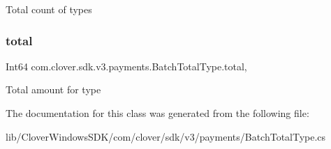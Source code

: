 Total count of types 

\mbox{\label{classcom_1_1clover_1_1sdk_1_1v3_1_1payments_1_1_batch_total_type_aa1fbbae3f87aa1c20b15cab3e1e03dd7}} 
\subsubsection{\texorpdfstring{total}{total}}
{\footnotesize\ttfamily Int64 com.\+clover.\+sdk.\+v3.\+payments.\+Batch\+Total\+Type.\+total\hspace{0.3cm}{\ttfamily [get]}, {\ttfamily [set]}}



Total amount for type 



The documentation for this class was generated from the following file\+:\begin{DoxyCompactItemize}
\item 
lib/\+Clover\+Windows\+S\+D\+K/com/clover/sdk/v3/payments/Batch\+Total\+Type.\+cs\end{DoxyCompactItemize}

